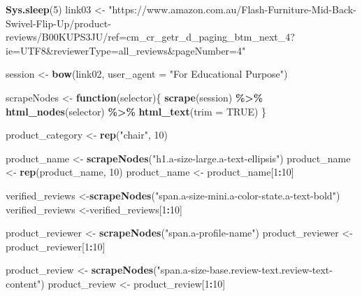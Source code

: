 \documentclass[
]{article}
\newenvironment{Shaded}{\begin{snugshade}}{\end{snugshade}}
\newcommand{\AttributeTok}[1]{\textcolor[rgb]{0.13,0.29,0.53}{#1}}
\newcommand{\ConstantTok}[1]{\textcolor[rgb]{0.56,0.35,0.01}{#1}}
\newcommand{\ControlFlowTok}[1]{\textcolor[rgb]{0.13,0.29,0.53}{\textbf{#1}}}
\newcommand{\DecValTok}[1]{\textcolor[rgb]{0.00,0.00,0.81}{#1}}
\newcommand{\FunctionTok}[1]{\textcolor[rgb]{0.13,0.29,0.53}{\textbf{#1}}}
\newcommand{\NormalTok}[1]{#1}
\newcommand{\OtherTok}[1]{\textcolor[rgb]{0.56,0.35,0.01}{#1}}
\newcommand{\SpecialCharTok}[1]{\textcolor[rgb]{0.81,0.36,0.00}{\textbf{#1}}}
\newcommand{\StringTok}[1]{\textcolor[rgb]{0.31,0.60,0.02}{#1}}
\begin{document}
\begin{Shaded}
\begin{Highlighting}[]
   \FunctionTok{Sys.sleep}\NormalTok{(}\DecValTok{5}\NormalTok{)}
\NormalTok{link03 }\OtherTok{\textless{}{-}} \StringTok{"https://www.amazon.com.au/Flash{-}Furniture{-}Mid{-}Back{-}Swivel{-}Flip{-}Up/product{-}reviews/B00KUPS3JU/ref=cm\_cr\_getr\_d\_paging\_btm\_next\_4?ie=UTF8\&reviewerType=all\_reviews\&pageNumber=4"}


\NormalTok{  session }\OtherTok{\textless{}{-}} \FunctionTok{bow}\NormalTok{(link02,}
               \AttributeTok{user\_agent =} \StringTok{"For Educational Purpose"}\NormalTok{)}

\NormalTok{  scrapeNodes }\OtherTok{\textless{}{-}} \ControlFlowTok{function}\NormalTok{(selector)\{}
    \FunctionTok{scrape}\NormalTok{(session) }\SpecialCharTok{\%\textgreater{}\%}
      \FunctionTok{html\_nodes}\NormalTok{(selector) }\SpecialCharTok{\%\textgreater{}\%}
      \FunctionTok{html\_text}\NormalTok{(}\AttributeTok{trim =} \ConstantTok{TRUE}\NormalTok{)}
\NormalTok{  \}}

\NormalTok{  product\_category }\OtherTok{\textless{}{-}} \FunctionTok{rep}\NormalTok{(}\StringTok{"chair"}\NormalTok{, }\DecValTok{10}\NormalTok{)}

\NormalTok{  product\_name }\OtherTok{\textless{}{-}} \FunctionTok{scrapeNodes}\NormalTok{(}\StringTok{"h1.a{-}size{-}large.a{-}text{-}ellipsis"}\NormalTok{)}
\NormalTok{  product\_name }\OtherTok{\textless{}{-}} \FunctionTok{rep}\NormalTok{(product\_name, }\DecValTok{10}\NormalTok{)}
\NormalTok{  product\_name }\OtherTok{\textless{}{-}}\NormalTok{ product\_name[}\DecValTok{1}\SpecialCharTok{:}\DecValTok{10}\NormalTok{]}
  
\NormalTok{  verified\_reviews }\OtherTok{\textless{}{-}}\FunctionTok{scrapeNodes}\NormalTok{(}\StringTok{"span.a{-}size{-}mini.a{-}color{-}state.a{-}text{-}bold"}\NormalTok{)}
\NormalTok{  verified\_reviews }\OtherTok{\textless{}{-}}\NormalTok{verified\_reviews[}\DecValTok{1}\SpecialCharTok{:}\DecValTok{10}\NormalTok{]}
  
\NormalTok{  product\_reviewer }\OtherTok{\textless{}{-}} \FunctionTok{scrapeNodes}\NormalTok{(}\StringTok{"span.a{-}profile{-}name"}\NormalTok{)}
\NormalTok{  product\_reviewer }\OtherTok{\textless{}{-}}\NormalTok{ product\_reviewer[}\DecValTok{1}\SpecialCharTok{:}\DecValTok{10}\NormalTok{]}
  
\NormalTok{  product\_review }\OtherTok{\textless{}{-}} \FunctionTok{scrapeNodes}\NormalTok{(}\StringTok{"span.a{-}size{-}base.review{-}text.review{-}text{-}content"}\NormalTok{)}
\NormalTok{  product\_review }\OtherTok{\textless{}{-}}\NormalTok{ product\_review[}\DecValTok{1}\SpecialCharTok{:}\DecValTok{10}\NormalTok{]}
  

\end{Highlighting}
\end{Shaded}
\end{document}
